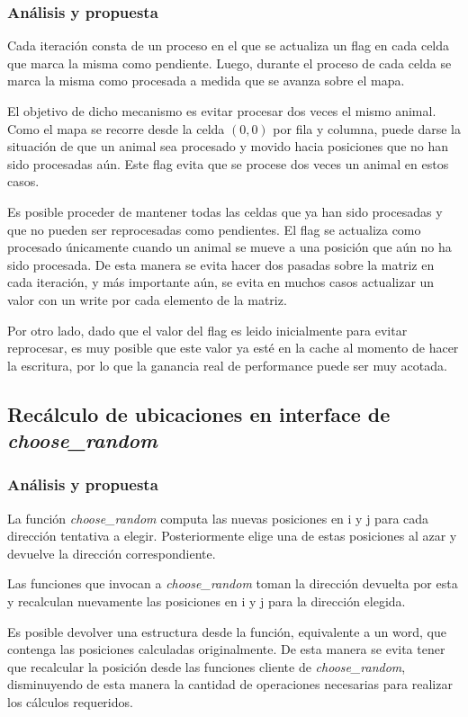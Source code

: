 \documentclass[a4paper,11pt]{article}
\begin{document}
\subsubsection{Análisis y propuesta}

Cada iteración consta de un proceso en el que se actualiza un flag en cada
celda que marca la misma como pendiente. Luego, durante el proceso de cada
celda se marca la misma como procesada a medida que se avanza sobre el mapa.

El objetivo de dicho mecanismo es evitar procesar dos veces el mismo animal.
Como el mapa se recorre desde la celda \((0, 0)\) por fila y columna, puede
darse la situación de que un animal sea procesado y movido hacia posiciones que
no han sido procesadas aún. Este flag evita que se procese dos veces un animal
en estos casos.

Es posible proceder de mantener todas las celdas que ya han sido procesadas y
que no pueden ser reprocesadas como pendientes. El flag se actualiza como
procesado únicamente cuando un animal se mueve a una posición que aún no ha
sido procesada. De esta manera se evita hacer dos pasadas sobre la matriz en
cada iteración, y más importante aún, se evita en muchos casos actualizar un
valor con un write por cada elemento de la matriz.

Por otro lado, dado que el valor del flag es leido inicialmente para evitar
reprocesar, es muy posible que este valor ya esté en la cache al momento de
hacer la escritura, por lo que la ganancia real de performance puede ser muy
acotada.

\subsection{Recálculo de ubicaciones en interface de \textit{choose\_random}}

\subsubsection{Análisis y propuesta}

La función \textit{choose\_random} computa las nuevas posiciones en i y j para
cada dirección tentativa a elegir. Posteriormente elige una de estas posiciones
al azar y devuelve la dirección correspondiente.

Las funciones que invocan a \textit{choose\_random} toman la dirección devuelta
por esta y recalculan nuevamente las posiciones en i y j para la dirección
elegida.

Es posible devolver una estructura desde la función, equivalente a un word, que
contenga las posiciones calculadas originalmente. De esta manera se evita tener
que recalcular la posición desde las funciones cliente de
\textit{choose\_random}, disminuyendo de esta manera la cantidad de operaciones
necesarias para realizar los cálculos requeridos.
\end{document}

